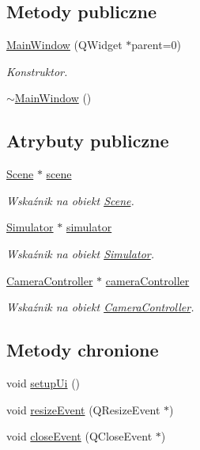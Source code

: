 \subsection*{Metody publiczne}
\begin{DoxyCompactItemize}
\item 
\hyperlink{class_main_window_a8b244be8b7b7db1b08de2a2acb9409db}{Main\-Window} (Q\-Widget $\ast$parent=0)
\begin{DoxyCompactList}\small\item\em Konstruktor. \end{DoxyCompactList}\item 
\hyperlink{class_main_window_ae98d00a93bc118200eeef9f9bba1dba7}{$\sim$\-Main\-Window} ()
\end{DoxyCompactItemize}
\subsection*{Atrybuty publiczne}
\begin{DoxyCompactItemize}
\item 
\hyperlink{class_scene}{Scene} $\ast$ \hyperlink{class_main_window_a5fac52928ceff08c8137f4689aee3874}{scene}
\begin{DoxyCompactList}\small\item\em Wskaźnik na obiekt \hyperlink{class_scene}{Scene}. \end{DoxyCompactList}\item 
\hyperlink{class_simulator}{Simulator} $\ast$ \hyperlink{class_main_window_a0bb9399936b67eb8dba43b80443c0469}{simulator}
\begin{DoxyCompactList}\small\item\em Wskaźnik na obiekt \hyperlink{class_simulator}{Simulator}. \end{DoxyCompactList}\item 
\hyperlink{class_camera_controller}{Camera\-Controller} $\ast$ \hyperlink{class_main_window_a5db1869c49b5f061ee85f0843ba7d6f9}{camera\-Controller}
\begin{DoxyCompactList}\small\item\em Wskaźnik na obiekt \hyperlink{class_camera_controller}{Camera\-Controller}. \end{DoxyCompactList}\end{DoxyCompactItemize}
\subsection*{Metody chronione}
\begin{DoxyCompactItemize}
\item 
void \hyperlink{class_main_window_aa353e8faed952a95e2fc62d7a5018a89}{setup\-Ui} ()
\item 
void \hyperlink{class_main_window_a8851a931482834eeec527490eedaf20e}{resize\-Event} (Q\-Resize\-Event $\ast$)
\item 
void \hyperlink{class_main_window_a38edb88d43e844aca9d2e762c8706565}{close\-Event} (Q\-Close\-Event $\ast$)
\end{DoxyCompactItemize}
